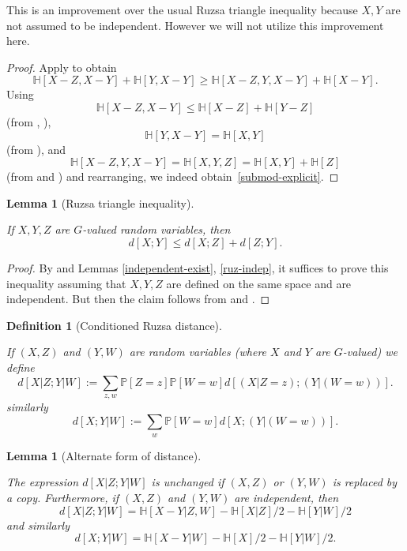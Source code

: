\documentclass[10pt,a4paper]{article}
\newtheorem{lemma}[theorem]{Lemma}
\newtheorem{definition}[theorem]{Definition}
\newcommand{\lean}[1]{}
\newcommand{\uses}[1]{}
\newcommand{\leanok}{}
\newcommand{\bbH}{\mathbb{H}}
\newcommand{\bbP}{\mathbb{P}}
\begin{document}
This is an improvement over the usual Ruzsa triangle inequality because $X,Y$ are not assumed to be independent.  However we will not utilize this improvement here.

\begin{proof}
  \uses{alt-submodularity,subadditive, relabeled-entropy, add-entropy}
  \leanok
  Apply  to obtain
  \[\bbH[X - Z, X - Y] + \bbH[Y, X - Y] \geq \bbH[X - Z, Y, X - Y] + \bbH[X - Y].\]
  Using
  \[\bbH[X - Z, X - Y] \leq \bbH[X - Z] + \bbH[Y - Z]\]
  (from , ),
  \[\bbH[Y, X - Y] = \bbH[X, Y] \]
  (from ), and
  \[\bbH[X - Z, Y, X - Y] = \bbH[X, Y, Z] = \bbH[X, Y] + \bbH[Z]\]
  (from  and ) and rearranging, we indeed obtain~\eqref{submod-explicit}.
\end{proof}

\begin{lemma}[Ruzsa triangle inequality]
  \label{ruzsa-triangle}
  \lean{rdist_triangle}
  \leanok
  If $X,Y,Z$ are $G$-valued random variables, then
$$ d[X ;Y] \leq d[X ;Z] + d[Z;Y].$$
\end{lemma}

\begin{proof}\uses{ruz-copy, ruz-indep, independent-exist, ruzsa-triangle-improved}\leanok By  and Lemmas \ref{independent-exist}, \ref{ruz-indep}, it suffices to prove this inequality assuming that $X,Y,Z$ are defined on the same space and are independent.  But then the claim follows from  and .
\end{proof}

\begin{definition}[Conditioned Ruzsa distance]\label{cond-dist-def}
  \uses{ruz-dist-def}
  \lean{condRuzsaDist}\leanok
If $(X, Z)$ and $(Y, W)$ are random variables (where $X$ and $Y$ are $G$-valued) we define
$$ d[X  | Z; Y | W] := \sum_{z,w}  \bbP[Z=z]  \bbP[W=w] d[(X|Z=z); (Y|(W=w))].$$
similarly
$$ d[X ; Y | W] := \sum_{w}  \bbP[W=w] d[X ; (Y|(W=w))].$$
\end{definition}

\begin{lemma}[Alternate form of distance]\label{cond-dist-alt}
\lean{condRuzsaDist_of_copy, condRuzsaDist'_of_copy, condRuzsaDist_of_indep, condRuzsaDist'_of_indep}\leanok
  The expression $d[X  | Z;Y | W]$ is unchanged if $(X,Z)$ or $(Y,W)$ is replaced by a copy.  Furthermore, if $(X,Z)$ and $(Y,W)$ are independent, then
$$  d[X  | Z;Y | W] = \bbH[X-Y|Z,W] - \bbH[X|Z]/2 - \bbH[Y|W]/2$$
and similarly
$$  d[X ;Y | W] = \bbH[X-Y|W] - \bbH[X]/2 - \bbH[Y|W]/2.$$
\end{lemma}
\end{document}
